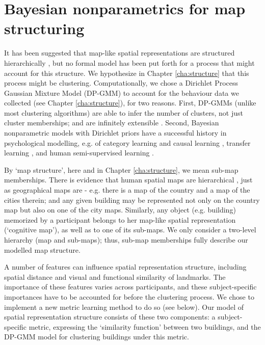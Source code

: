 \section{Bayesian nonparametrics for map structuring}
\label{sec:bayesmap}

It has been suggested that map-like spatial representations are structured hierarchically \citep{hirtle1985evidence,mcnamara1989subjective,greenauer2010micro}, but no formal model has been put forth for a process that might account for this structure. We hypothesize in Chapter \ref{cha:structure} that this process might be clustering. Computationally, we chose a Dirichlet Process Gaussian Mixture Model (DP-GMM) to account for the behaviour data we collected (see Chapter \ref{cha:structure}), for two reasons. First, DP-GMMs (unlike most clustering algorithms) are able to infer the number of clusters, not just cluster memberships; and are infinitely extensible \citep{rasmussen1999infinite}. Second, Bayesian nonparametric models with Dirichlet priors have a successful history in psychological modelling, e.g. of category learning and causal learning \citep{tenenbaum2011grow}, transfer learning \citep{canini2010modeling}, and human semi-supervised learning \citep{gibson2013human}.

By `map structure', here and in Chapter \ref{cha:structure}, we mean sub-map memberships. There is evidence that human spatial maps are hierarchical \citep{hirtle1985evidence,mcnamara1989subjective,greenauer2010micro}, just as geographical maps are - e.g. there is a map of the country and a map of the cities therein; and any given building may be represented not only on the country map but also on one of the city maps. Similarly, any object (e.g. building) memorized by a participant belongs to her map-like spatial representation (`cognitive map'), as well as to one of its sub-maps. We only consider a two-level hierarchy (map and sub-maps); thus, sub-map memberships fully describe our modelled map structure.

A number of features can influence spatial representation structure, including spatial distance and visual and functional similarity of landmarks. The importance of these features varies across participants, and these subject-specific importances have to be accounted for before the clustering process. We chose to implement a new metric learning method to do so (see below). Our model of spatial representation structure consists of these two components: a subject-specific metric, expressing the `similarity function' between two buildings, and the DP-GMM model for clustering buildings under this metric.

